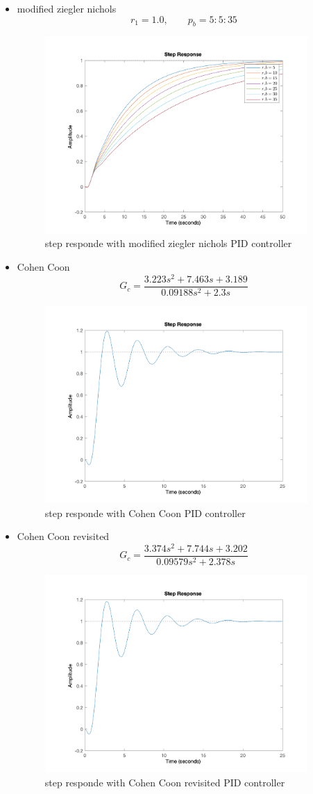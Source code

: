 \begin{itemize}
    \item modified ziegler nichols
    $$
    r_1 = 1.0, \qquad p_b = 5:5:35
    $$
    \begin{figure}[H]
        \caption{step responde with modified ziegler nichols PID controller}
        \centering
        \includegraphics[width=10cm]{../Figure/Q1/b/mzn.png}
    \end{figure}
    \item Cohen Coon
    $$
    G_c =   \dfrac{3.223 s^2 + 7.463 s + 3.189}{ 0.09188 s^2 + 2.3 s}
    $$
    \begin{figure}[H]
        \caption{step responde with Cohen Coon PID controller}
        \centering
        \includegraphics[width=10cm]{../Figure/Q1/b/cc.png}
    \end{figure}
    \newpage
    \item Cohen Coon revisited
    $$
    G_c =   \dfrac{3.374 s^2 + 7.744 s + 3.202}{0.09579 s^2 + 2.378 s}
    $$ 
    \begin{figure}[H]
        \caption{step responde with Cohen Coon revisited PID controller}
        \centering
        \includegraphics[width=10cm]{../Figure/Q1/b/ccr.png}

\end{figure}
\end{itemize}
